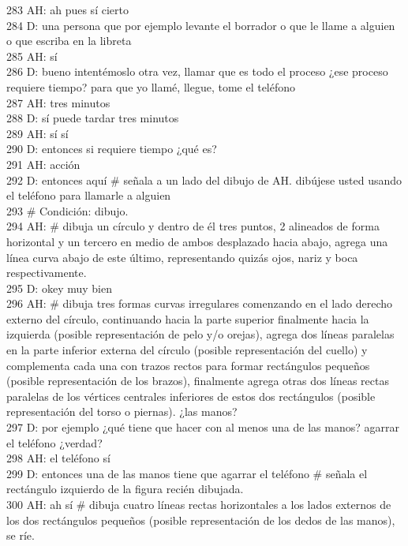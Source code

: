 283 AH: ah pues sí cierto\\
284 D: una persona que por ejemplo levante el borrador o que le llame a alguien o que escriba en la libreta\\
285 AH: sí\\
286 D: bueno intentémoslo otra vez, llamar que es todo el proceso ¿ese proceso requiere tiempo? para que yo llamé, llegue, tome el teléfono\\
287 AH: tres minutos\\
288 D: sí puede tardar tres minutos\\
289 AH: sí sí\\
290 D: entonces si requiere tiempo ¿qué es?\\
291 AH: acción\\
292 D: entonces aquí \# señala a un lado del dibujo de AH. dibújese usted usando el teléfono para llamarle a alguien\\
293 \# Condición: dibujo.\\
294 AH: \# dibuja un círculo y dentro de él tres puntos, 2 alineados de forma horizontal y un tercero en medio de ambos desplazado hacia abajo, agrega una línea curva abajo de este último, representando quizás ojos, nariz y boca respectivamente.\\
295 D: okey muy bien\\
296 AH: \# dibuja tres formas curvas irregulares comenzando en el lado derecho externo del círculo, continuando hacia la parte superior  finalmente hacia la izquierda (posible representación de pelo y/o orejas), agrega dos líneas paralelas en la parte inferior externa del círculo (posible representación del cuello) y complementa cada una con trazos rectos para formar rectángulos pequeños (posible representación de los brazos), finalmente agrega otras dos líneas rectas paralelas de los vértices centrales inferiores de estos dos rectángulos (posible representación del torso o piernas). ¿las manos?\\
297 D: por ejemplo ¿qué tiene que hacer con al menos una de las manos? agarrar el teléfono ¿verdad?\\
298 AH: el teléfono sí\\
299 D: entonces una de las manos tiene que agarrar el teléfono \# señala el rectángulo izquierdo de la figura recién dibujada.\\
300 AH: ah sí \# dibuja cuatro líneas rectas horizontales a los lados externos de los dos rectángulos pequeños (posible representación de los dedos de las manos), se ríe.\\
